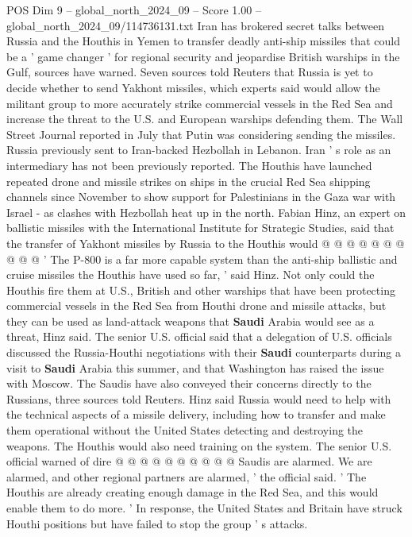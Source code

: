 \begin{textsample}{POS Dim 9 – global\_north\_2024\_09 – Score 1.00 – global\_north\_2024\_09/114736131.txt}  \label{ex:f9_pos_426}
Iran has brokered secret talks between Russia and the Houthis in Yemen to transfer deadly anti-ship missiles that could be a ' game changer ' for regional security and jeopardise British warships in the Gulf, sources have warned.
Seven sources told Reuters that Russia is yet to decide whether to send Yakhont missiles, which experts said would allow the militant group to more accurately strike commercial vessels in the Red Sea and increase the threat to the U.S. and European warships defending them.
The Wall Street Journal reported in July that Putin was considering sending the missiles.
Russia previously sent to Iran-backed Hezbollah in Lebanon.
Iran ' s role as an intermediary has not been previously reported.
The Houthis have launched repeated drone and missile strikes on ships in the crucial Red Sea shipping channels since November to show support for Palestinians in the Gaza war with Israel - as clashes with Hezbollah heat up in the north.
Fabian Hinz, an expert on ballistic missiles with the International Institute for Strategic Studies, said that the transfer of Yakhont missiles by Russia to the Houthis would @ @ @ @ @ @ @ @ @ @ ' The P-800 is a far more capable system than the anti-ship ballistic and cruise missiles the Houthis have used so far, ' said Hinz.
Not only could the Houthis fire them at U.S., British and other warships that have been protecting commercial vessels in the Red Sea from Houthi drone and missile attacks, but they can be used as land-attack weapons that \textbf{Saudi} Arabia would see as a threat, Hinz said.
The senior U.S. official said that a delegation of U.S. officials discussed the Russia-Houthi negotiations with their \textbf{Saudi} counterparts during a visit to \textbf{Saudi} Arabia this summer, and that Washington has raised the issue with Moscow.
The Saudis have also conveyed their concerns directly to the Russians, three sources told Reuters.
Hinz said Russia would need to help with the technical aspects of a missile delivery, including how to transfer and make them operational without the United States detecting and destroying the weapons.
The Houthis would also need training on the system.
The senior U.S. official warned of dire @ @ @ @ @ @ @ @ @ @ Saudis are alarmed.
We are alarmed, and other regional partners are alarmed, ' the official said. ' The Houthis are already creating enough damage in the Red Sea, and this would enable them to do more. ' In response, the United States and Britain have struck Houthi positions but have failed to stop the group ' s attacks.

\end{textsample}
